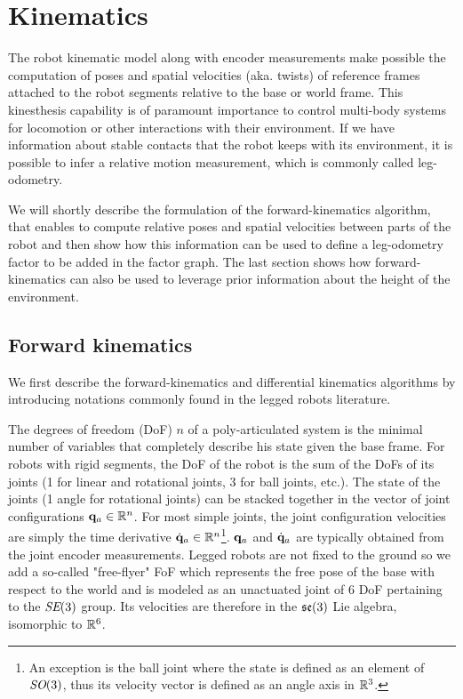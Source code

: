 \chapter{Kinematics}
\minitoc
\bigskip

The robot kinematic model along with encoder measurements make possible the computation of poses and spatial velocities \cite{featherstone2014rigid} (aka. twists) 
of reference frames attached to the robot segments relative to the base or world frame. This kinesthesis capability is of paramount importance to control
multi-body systems for locomotion or other interactions with their environment. If we have information about stable contacts that the robot keeps with
its environment, it is possible to infer a relative motion measurement, which is commonly called leg-odometry.

We will shortly describe the formulation of the forward-kinematics algorithm, that enables to compute relative poses and spatial velocities between parts of the robot
and then show how this information can be used to define a leg-odometry factor to be added in the factor graph. The last section shows how forward-kinematics can also be used to leverage prior 
information about the height of the environment. 



\section{Forward kinematics}
\label{sec:forward_kinematics}
We first describe the forward-kinematics and differential kinematics algorithms by introducing notations commonly found in the legged robots literature.

The degrees of freedom (DoF) $n$ of a poly-articulated system is the minimal number of variables that completely describe his state given the base frame. 
For robots with rigid segments, the DoF of the robot is the sum of the DoFs of its joints (1 for linear and rotational joints, 3 for
ball joints, etc.).
The state of the joints (1 angle for rotational joints) can be stacked together in the vector of joint configurations 
${\bf q}_a \in \mathbb{R}^n$. For most simple joints, the joint configuration velocities are simply the time derivative $\dot{{\bf q}}_a \in \mathbb{R}^n$\footnote{An exception is the ball joint where the 
state is defined as an element of $\textit{SO}(3)$, thus its velocity vector is defined as an angle axis in $\mathbb{R}^3$.}. ${\bf q}_a$ and $\dot{{\bf q}}_a$ are typically obtained from
the joint encoder measurements.
Legged robots are not fixed to the ground so we add a so-called "free-flyer" FoF which represents the free pose of the base with respect to the world and is modeled as an 
unactuated joint of 6 DoF pertaining to the $\textit{SE}(3)$ group. Its velocities are therefore in the ${\mathfrak {se}}(3)$  Lie algebra, isomorphic to $\mathbb{R}^6$. 

